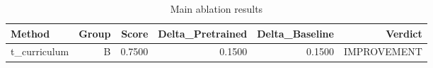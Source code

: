 \begin{table}[htbp]
\centering
\caption{Main ablation results}
\label{tab:main-results}
\begin{tabular}{lrrrrr}
\toprule
\textbf{Method} & \textbf{Group} & \textbf{Score} & \textbf{Delta\_Pretrained} & \textbf{Delta\_Baseline} & \textbf{Verdict} \\
\midrule
t\_curriculum & B & 0.7500 & 0.1500 & 0.1500 & IMPROVEMENT \\
\bottomrule
\end{tabular}
\end{table}